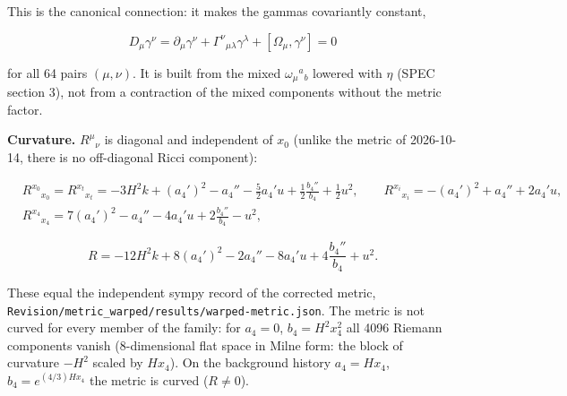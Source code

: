 \documentclass[11pt]{article}
\begin{document}
This is the canonical connection: it makes the gammas covariantly constant,

\[
D_\mu\gamma^\nu = \partial_\mu\gamma^\nu + \Gamma^\nu{}_{\mu\lambda}\gamma^\lambda + [\Omega_\mu, \gamma^\nu] = 0
\]

for all 64 pairs $(\mu, \nu)$. It is built from the mixed $\omega_\mu{}^a{}_b$ lowered with $\eta$ (SPEC section 3), not from a contraction of the mixed components without the metric factor.

\textbf{Curvature.} $R^\mu{}_\nu$ is diagonal and independent of $x_0$ (unlike the metric of 2026-10-14, there is no off-diagonal Ricci component):

\[
\begin{aligned}
& R^{x_0}{}_{x_0} = R^{x_t}{}_{x_t} = -3H^2k + (a_4')^2 - a_4'' - \tfrac52a_4'u + \tfrac12\frac{b_4''}{b_4} + \tfrac12u^2, \qquad R^{x_i}{}_{x_i} = -(a_4')^2 + a_4'' + 2a_4'u, \\
& R^{x_4}{}_{x_4} = 7(a_4')^2 - a_4'' - 4a_4'u + 2\frac{b_4''}{b_4} - u^2,
\end{aligned}
\]

\[
R = -12H^2k + 8(a_4')^2 - 2a_4'' - 8a_4'u + 4\frac{b_4''}{b_4} + u^2 .
\]

These equal the independent sympy record of the corrected metric, \texttt{Revision\allowbreak{}/metric\_\allowbreak{}warped/r\allowbreak{}esults/w\allowbreak{}arped-me\allowbreak{}tric.jso\allowbreak{}n}. The metric is not curved for every member of the family: for $a_4 = 0$, $b_4 = H^2x_4^2$ all 4096 Riemann components vanish (8-dimensional flat space in Milne form: the block of curvature $-H^2$ scaled by $Hx_4$). On the background history $a_4 = Hx_4$, $b_4 = e^{(4/3)Hx_4}$ the metric is curved ($R \neq 0$).
\end{document}

